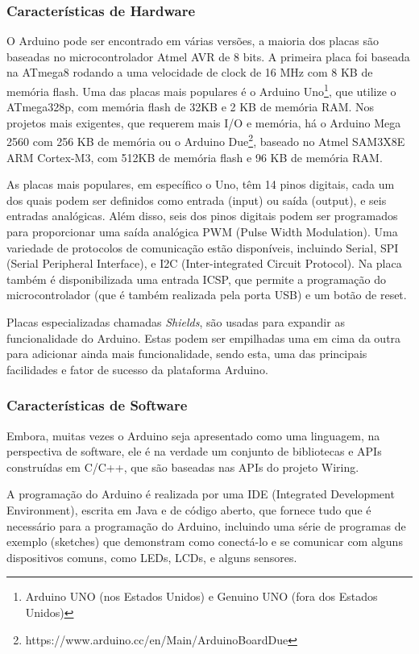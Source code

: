 \subsubsection{Características de Hardware}

O Arduino pode ser encontrado em várias versões, a maioria dos placas
são baseadas no microcontrolador Atmel AVR de 8 bits. A primeira placa
foi baseada na ATmega8 rodando a uma velocidade de clock de 16 MHz
com 8 KB de memória flash\cite{arduino:evans:2013}. Uma das placas
mais populares é o Arduino Uno\footnote{Arduino UNO (nos Estados Unidos) e Genuino UNO (fora dos Estados Unidos)},
que utilize o ATmega328p, com memória flash de 32KB e 2 KB de memória
RAM. Nos projetos mais exigentes, que requerem mais I/O e memória,
há o Arduino Mega 2560 com 256 KB de memória ou o Arduino Due\footnote{https://www.arduino.cc/en/Main/ArduinoBoardDue},
baseado no Atmel SAM3X8E ARM Cortex-M3, com 512KB de memória flash
e 96 KB de memória RAM.

As placas mais populares, em específico o Uno, têm 14 pinos digitais,
cada um dos quais podem ser definidos como entrada (input) ou saída
(output), e seis entradas analógicas. Além disso, seis dos pinos digitais
podem ser programados para proporcionar uma saída analógica PWM (Pulse
Width Modulation). Uma variedade de protocolos de comunicação estão
disponíveis, incluindo Serial, SPI (Serial Peripheral Interface),
e I2C (Inter-integrated Circuit Protocol). Na placa também é disponibilizada
uma entrada ICSP, que permite a programação do microcontrolador (que
é também realizada pela porta USB) e um botão de reset.

Placas especializadas chamadas \emph{Shields}, são usadas para expandir
as funcionalidade do Arduino. Estas podem ser empilhadas uma em cima
da outra para adicionar ainda mais funcionalidade, sendo esta, uma
das principais facilidades e fator de sucesso da plataforma Arduino.

\subsubsection{Características de Software}

Embora, muitas vezes o Arduino seja apresentado como uma linguagem,
na perspectiva de software, ele é na verdade um conjunto de bibliotecas
e APIs construídas em C/C++, que são baseadas nas APIs do projeto
Wiring.

A programação do Arduino é realizada por uma IDE (Integrated Development
Environment), escrita em Java e de código aberto\cite{arduino:source},
que fornece tudo que é necessário para a programação do Arduino, incluindo
uma série de programas de exemplo (sketches) que demonstram como conectá-lo
e se comunicar com alguns dispositivos comuns, como LEDs, LCDs, e
alguns sensores. 

